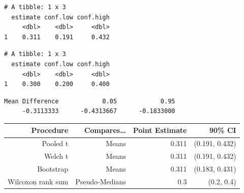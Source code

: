 \documentclass[
]{book}
\newenvironment{Shaded}{\begin{snugshade}}{\end{snugshade}}
\newcommand{\DataTypeTok}[1]{\textcolor[rgb]{0.13,0.29,0.53}{#1}}
\newcommand{\DecValTok}[1]{\textcolor[rgb]{0.00,0.00,0.81}{#1}}
\newcommand{\FloatTok}[1]{\textcolor[rgb]{0.00,0.00,0.81}{#1}}
\newcommand{\KeywordTok}[1]{\textcolor[rgb]{0.13,0.29,0.53}{\textbf{#1}}}
\newcommand{\NormalTok}[1]{#1}
\newcommand{\OperatorTok}[1]{\textcolor[rgb]{0.81,0.36,0.00}{\textbf{#1}}}
\newcommand{\OtherTok}[1]{\textcolor[rgb]{0.56,0.35,0.01}{#1}}
\newcommand{\StringTok}[1]{\textcolor[rgb]{0.31,0.60,0.02}{#1}}
\begin{document}
\begin{verbatim}
# A tibble: 1 x 3
  estimate conf.low conf.high
     <dbl>    <dbl>     <dbl>
1    0.311    0.191     0.432
\end{verbatim}

\begin{Shaded}
\end{Shaded}

\begin{verbatim}
# A tibble: 1 x 3
  estimate conf.low conf.high
     <dbl>    <dbl>     <dbl>
1    0.300    0.200     0.400
\end{verbatim}

\begin{Shaded}
\end{Shaded}

\begin{verbatim}
Mean Difference            0.05            0.95 
     -0.3113333      -0.4313667      -0.1833000 
\end{verbatim}

\begin{longtable}[]{@{}rrrr@{}}
\toprule
Procedure & Compares\ldots{} & Point Estimate & 90\% CI\tabularnewline
\midrule
\endhead
Pooled t & Means & 0.311 & (0.191, 0.432)\tabularnewline
Welch t & Means & 0.311 & (0.191, 0.432)\tabularnewline
Bootstrap & Means & 0.311 & (0.183, 0.431)\tabularnewline
Wilcoxon rank sum & Pseudo-Medians & 0.3 & (0.2, 0.4)\tabularnewline
\bottomrule
\end{longtable}
\end{document}
